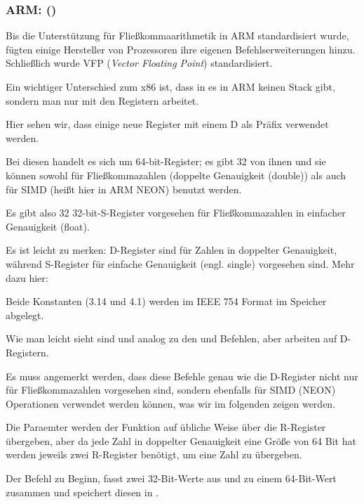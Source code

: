 \subsubsection{ARM: \OptimizingXcodeIV (\ARMMode)}
Bis die Unterstützung für Fließkommaarithmetik in ARM standardisiert wurde,
fügten einige Hersteller von Prozessoren ihre eigenen Befehlserweiterungen
hinzu. 
Schließlich wurde VFP (\emph{Vector Floating Point}) standardisiert.

Ein wichtiger Unterschied zum x86 ist, dass in es in ARM keinen Stack gibt,
sondern man nur mit den Registern arbeitet.




Hier sehen wir, dass einige neue Register mit einem D als Präfix verwendet
werden.

Bei diesen handelt es sich um 64-bit-Register; es gibt 32 von ihnen und sie
können sowohl für Fließkommazahlen (doppelte Genauigkeit (double)) als auch für
SIMD (heißt hier in ARM NEON) benutzt werden.

Es gibt also 32 32-bit-S-Register vorgesehen für Fließkommazahlen in einfacher
Genauigkeit (float).

Es ist leicht zu merken: D-Register sind für Zahlen in doppelter Genauigkeit,
während S-Register für einfache Genauigkeit (engl. single) vorgesehen sind.
Mehr dazu hier:

Beide Konstanten (3.14 und 4.1) werden im IEEE 754 Format im Speicher abgelegt.

Wie man leicht sieht sind  und  analog zu den  und
\MOV Befehlen, aber arbeiten auf D-Registern.

Es muss angemerkt werden, dass diese Befehle genau wie die D-Register nicht nur
für Fließkommazahlen vorgesehen sind, sondern ebenfalls für SIMD (NEON)
Operationen verwendet werden können, was wir im folgenden zeigen werden.

Die Paraemter werden der Funktion auf übliche Weise über die R-Register
übergeben, aber da jede Zahl in doppelter Genauigkeit eine Größe von 64 Bit hat
werden jeweils zwei R-Register benötigt, um eine Zahl zu übergeben.

Der Befehl  zu Beginn, fasst zwei 32-Bit-Werte aus
 und  zu einem 64-Bit-Wert zusammen und speichert diesen in
.

